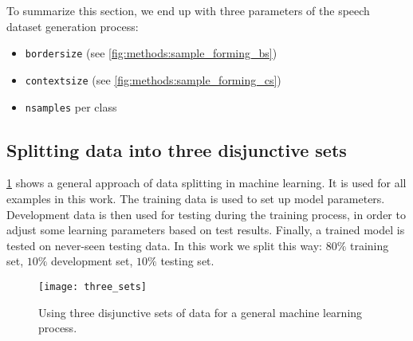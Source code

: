 To summarize this section, we end up with three parameters of the speech dataset generation process:

\begin{itemize}
\item \texttt{border\textunderscore size} (see \cref{fig:methods:sample_forming_bs})
\item \texttt{context\textunderscore size} (see \cref{fig:methods:sample_forming_cs})
\item \texttt{n\textunderscore samples} per class
\end{itemize}

\subsection*{Splitting data into three disjunctive sets}
\cref{fig:methods:three_sets} shows a general approach of data splitting in machine learning. It is used for all examples in this work. The training data is used to set up model parameters. Development data is then used for testing during the training process, in order to adjust some learning parameters based on test results. Finally, a trained model is tested on never-seen testing data. In this work we split this way: $ 80\% $ training set, $ 10\% $ development set, $ 10\% $ testing set.

\begin{figure}[H]
\centering
\texttt{[image: three\_sets]}
\caption{Using three disjunctive sets of data for a general machine learning process.}
\label{fig:methods:three_sets}
\end{figure}